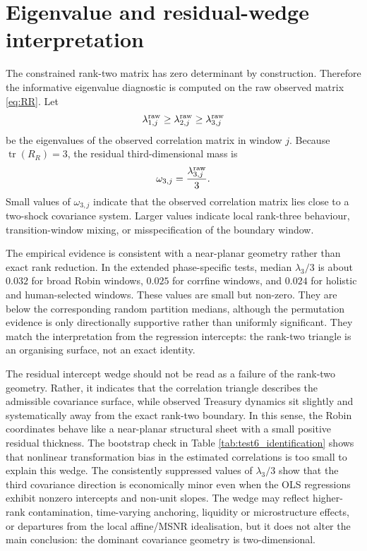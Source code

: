 \documentclass[11pt]{article}
\begin{document}
\section{Eigenvalue and residual-wedge interpretation}

The constrained rank-two matrix has zero determinant by construction. Therefore the informative eigenvalue diagnostic is computed on the raw observed matrix \eqref{eq:RR}. Let
\begin{equation}
 \lambda_{1,j}^{\rm raw}\geq \lambda_{2,j}^{\rm raw}\geq \lambda_{3,j}^{\rm raw}
\end{equation}
be the eigenvalues of the observed correlation matrix in window $j$. Because $\operatorname{tr}(R_R)=3$, the residual third-dimensional mass is
\begin{equation}
 \omega_{3,j}=\frac{\lambda_{3,j}^{\rm raw}}{3}.
\end{equation}
Small values of $\omega_{3,j}$ indicate that the observed correlation matrix lies close to a two-shock covariance system. Larger values indicate local rank-three behaviour, transition-window mixing, or misspecification of the boundary window.

The empirical evidence is consistent with a near-planar geometry rather than exact rank reduction. In the extended phase-specific tests, median $\lambda_3/3$ is about $0.032$ for broad Robin windows, $0.025$ for corrfine windows, and $0.024$ for holistic and human-selected windows. These values are small but non-zero. They are below the corresponding random partition medians, although the permutation evidence is only directionally supportive rather than uniformly significant. They match the interpretation from the regression intercepts: the rank-two triangle is an organising surface, not an exact identity.

The residual intercept wedge should not be read as a failure of the rank-two geometry. Rather, it indicates that the correlation triangle describes the admissible covariance surface, while observed Treasury dynamics sit slightly and systematically away from the exact rank-two boundary. In this sense, the Robin coordinates behave like a near-planar structural sheet with a small positive residual thickness. The bootstrap check in Table \ref{tab:test6_identification} shows that nonlinear transformation bias in the estimated correlations is too small to explain this wedge. The consistently suppressed values of $\lambda_3/3$ show that the third covariance direction is economically minor even when the OLS regressions exhibit nonzero intercepts and non-unit slopes. The wedge may reflect higher-rank contamination, time-varying anchoring, liquidity or microstructure effects, or departures from the local affine/MSNR idealisation, but it does not alter the main conclusion: the dominant covariance geometry is two-dimensional.
\end{document}
